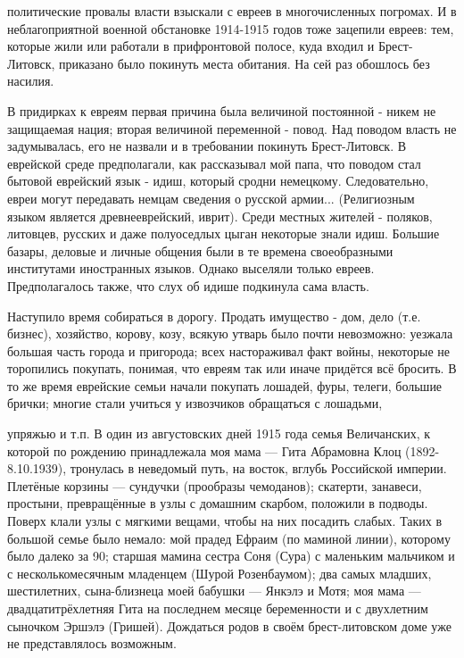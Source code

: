 \label{066-1}
политические провалы власти взыскали с евреев в многочисленных погромах. И в неблагоприятной военной обстановке 1914-1915 годов тоже зацепили евреев: тем, которые жили или работали в прифронтовой полосе, куда входил и Брест-Литовск, приказано было покинуть места обитания. На сей раз обошлось без насилия.

В придирках к евреям первая причина была величиной постоянной - никем не защищаемая нация; вторая величиной переменной - повод. Над поводом власть не задумывалась, его не назвали и в требовании покинуть Брест-Литовск. В еврейской среде предполагали, как рассказывал мой папа, что поводом стал бытовой еврейский язык - идиш, который сродни немецкому. Следовательно, евреи могут передавать немцам сведения о русской армии... (Религиозным языком является древнееврейский, иврит). Среди местных жителей - поляков, литовцев, русских и даже полуоседлых цыган некоторые знали идиш. Большие базары, деловые и личные общения были в те времена своеобразными 
институтами иностранных языков. Однако выселяли только евреев. Предполагалось также, что слух об идише подкинула сама власть.

Наступило время собираться в дорогу. Продать имущество - дом, дело (т.е. бизнес), хозяйство, корову, козу, всякую утварь было почти невозможно: уезжала большая часть города и пригорода; всех настораживал факт войны, некоторые не торопились покупать, понимая, что евреям так или иначе придётся всё бросить. В то же время еврейские семьи начали покупать лошадей, фуры, телеги, большие брички; многие стали учиться у извозчиков обращаться с лошадьми,

\label{067-1}
упряжью и т.п. В один из августовских дней 1915 года семья Величанских, к которой по рождению принадлежала моя мама — Гита Абрамовна Клоц (1892-8.10.1939), тронулась в неведомый путь, на восток, вглубь Российской империи. Плетёные корзины — сундучки (прообразы чемоданов); скатерти, занавеси, простыни, превращённые в узлы с домашним скарбом, положили в подводы. Поверх клали узлы с мягкими вещами, чтобы на них посадить слабых. Таких в большой семье было немало: мой прадед Ефраим (по маминой линии), которому было далеко за 90; старшая мамина сестра Соня (Сура) с маленьким мальчиком и с несколькомесячным младенцем (Шурой Розенбаумом); два самых младших, шестилетних, сына-близнеца моей бабушки — Янкэлэ и Мотя; моя мама — двадцатитрёхлетняя Гита на последнем месяце беременности и с двухлетним сыночком Эршэлэ (Гришей). Дождаться родов в своём брест-литовском доме уже не представлялось возможным.

